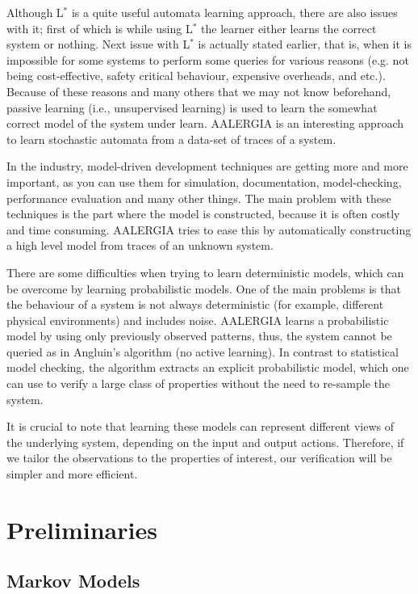\documentclass[
a4paper,
12pt
]{scrartcl}
\begin{document}
\par Although L$^*$ is a quite useful automata learning approach, there are also issues with it; first of which is while using L$^*$ the learner either learns the correct system or nothing. Next issue with L$^*$ is actually stated earlier, that is, when it is impossible for some systems to perform some queries for various reasons (e.g. not being cost-effective, safety critical behaviour, expensive overheads, and etc.). Because of these reasons and many others that we may not know beforehand, passive learning (i.e., unsupervised learning) is used to learn the somewhat correct model of the system under learn. AALERGIA\cite{Mao.} is an interesting approach to learn stochastic automata from a data-set of traces of a system.
\par In the industry, model-driven development techniques are getting more and more important, as you can use them for simulation, documentation, model-checking, performance evaluation and many other things. The main problem with these techniques is the part where the model is constructed, because it is often costly and time consuming. AALERGIA tries to ease this by automatically constructing a high level model from traces of an unknown system.
\par There are some difficulties when trying to learn deterministic models, which can be overcome by learning probabilistic models. One of the main problems is that the behaviour of a system is not always deterministic (for example, different physical environments) and includes noise. AALERGIA learns a probabilistic model by using only previously observed patterns, thus, the system cannot be queried as in Angluin's algorithm (no active learning). In contrast to statistical model checking, the algorithm extracts an explicit probabilistic model, which one can use to verify a large class of properties without the need to re-sample the system.
\par It is crucial to note that learning these models can represent different views of the underlying system, depending on the input and output actions. Therefore, if we tailor the observations to the properties of interest, our verification will be simpler and more efficient.

\newpage
\section{Preliminaries}
\subsection{Markov Models}
\end{document}
